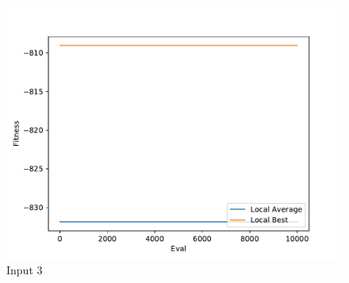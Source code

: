 \documentclass{standalone}
\begin{document}
\begin{figure}[!htb]
	\caption{Input 3}
	\label{fig:graph_3034}
	\includegraphics[width=\textwidth]{../graphs/graphs/3034.pdf}
\end{figure}
\end{document}
